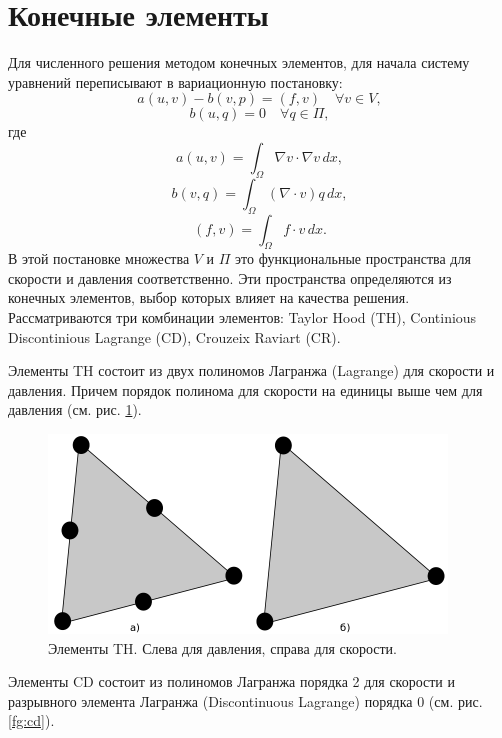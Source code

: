 \documentclass[12pt]{article}
\begin{document}
\section{Конечные элементы}
Для численного решения методом конечных элементов, для начала систему уравнений переписывают в вариационную постановку:
\begin{equation}
a(u,v)-b(v,p)=(f,v) \quad \forall v \in V,
\end{equation}
\begin{equation}
b(u,q)=0 \quad \forall q \in \Pi,
\end{equation}
где 
\begin{equation}
a(u,v)=\int_\Omega \nabla v \cdot \nabla v \, dx,
\end{equation}
\begin{equation}
b(v,q)=\int_\Omega (\nabla \cdot v) q \, dx,
\end{equation}
\begin{equation}
(f,v)=\int_\Omega f \cdot v \, dx.
\end{equation}
В этой постановке множества $V$ и $\Pi$ это функциональные пространства для скорости и давления соответственно. Эти пространства определяются из конечных элементов, выбор которых влияет на качества решения. Рассматриваются три комбинации элементов: Taylor Hood (TH), Continious Discontinious Lagrange (CD), Crouzeix Raviart (CR). 

Элементы TH состоит из двух полиномов Лагранжа (Lagrange) для скорости и давления. Причем порядок полинома для скорости на единицы выше чем для давления (см. рис. \ref{fg:th}).

\begin{figure}
	\begin{center}
		\includegraphics[width=400px]{pics/TH}
		\caption{Элементы TH. Слева для давления, справа для скорости.}
		\label{fg:th}
	\end{center}
\end{figure}

Элементы CD состоит из полиномов Лагранжа порядка 2 для скорости и разрывного элемента Лагранжа (Discontinuous Lagrange) порядка 0 (см. рис. \ref{fg:cd}).
\end{document}

